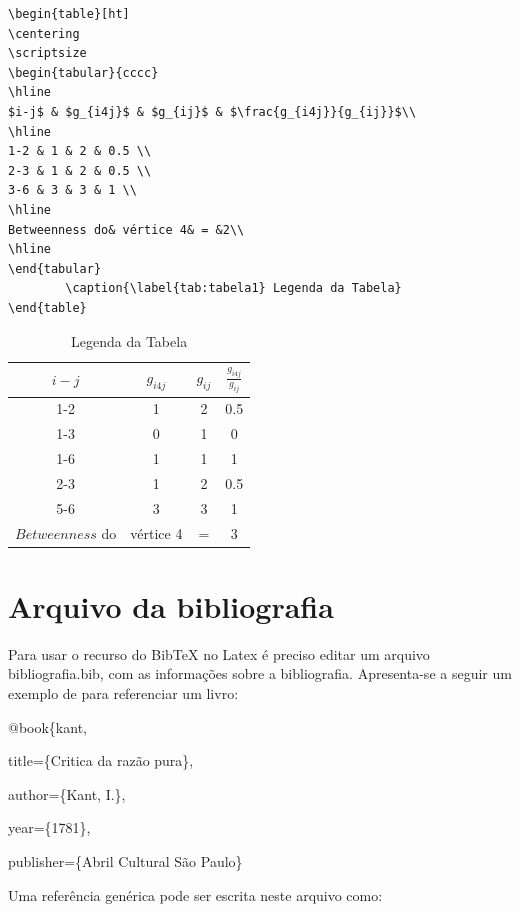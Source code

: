 \begin{verbatim}
\begin{table}[ht]
\centering
\scriptsize
\begin{tabular}{cccc}
\hline
$i-j$ & $g_{i4j}$ & $g_{ij}$ & $\frac{g_{i4j}}{g_{ij}}$\\
\hline
1-2 & 1 & 2 & 0.5 \\
2-3 & 1 & 2 & 0.5 \\
3-6 & 3 & 3 & 1 \\
\hline
Betweenness do& vértice 4& = &2\\
\hline
\end{tabular}
        \caption{\label{tab:tabela1} Legenda da Tabela}
\end{table}
\end{verbatim}

\begin{table}[ht]
\centering
\begin{tabular}{cccc}
\hline
$i-j$ & $g_{i4j}$ & $g_{ij}$ & $\frac{g_{i4j}}{g_{ij}}$\\
\hline
1-2 & 1 & 2 & 0.5 \\
1-3 & 0 & 1 & 0 \\
1-6 & 1 & 1 & 1 \\
2-3 & 1 & 2 & 0.5 \\
5-6 & 3 & 3 & 1 \\
\hline
$Betweenness$ do& vértice 4& = &3\\
\hline
\end{tabular}
        \caption{\label{tab:tabela1} Legenda da Tabela}
\end{table}



\section{Arquivo da bibliografia}

Para usar o recurso do BibTeX no Latex é preciso editar um arquivo
bibliografia.bib, com as informações sobre a bibliografia.
Apresenta-se a seguir um exemplo de para referenciar um livro:

\bigskip

@book\{kant,

  title=\{Critica da razão pura\},

  author=\{Kant, I.\},

  year=\{1781\},

  publisher=\{Abril Cultural São Paulo\}


Uma referência genérica pode ser escrita neste arquivo como:


